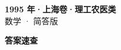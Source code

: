 \documentclass[zihao=-4, a4paper]{ctexart}
\begin{document}
\begin{center}
  {\Large\bfseries 1995 年·上海卷·理工农医类}\\[4pt]
  {\large 数学 · 简答版}
\end{center}
\medskip
{}

\clearpage
{}
\begin{center}{\Large\bfseries 答案速查}\end{center}
\medskip

\end{document}

